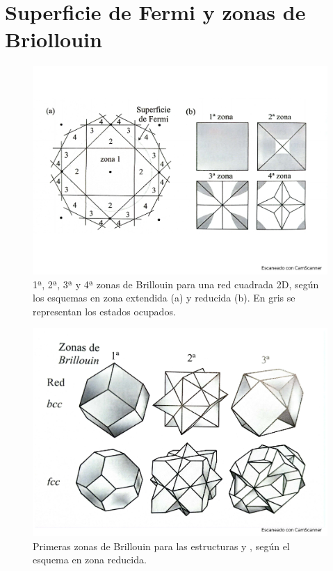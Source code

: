 \section{Superficie de Fermi y zonas de Briollouin}
\begin{figure}[h!] \centering
    \includegraphics[scale=0.5]{Cuerpo/Ch_07/Fotos libro 7.pdf}
    \caption{1ª, 2ª, 3ª y 4ª zonas de Brillouin para una red cuadrada 2D, según los esquemas en zona extendida (a) y reducida (b). En gris se representan los estados ocupados.}
    \label{Fig:07-07}
\end{figure}    
\begin{figure}[h!] \centering
    \includegraphics[scale=0.5]{Cuerpo/Ch_07/Fotos libro 8.pdf}
    \caption{Primeras zonas de Brillouin para las estructuras \bcc y \fcc, según el esquema en zona reducida.}
    \label{Fig:07-08}
\end{figure}    
